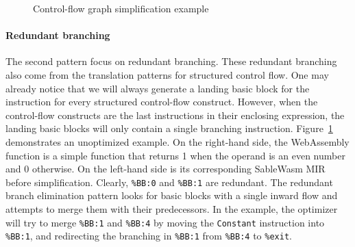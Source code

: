 \begin{figure}
    \begin{minipage}[t]{.49\textwidth}
        
    \end{minipage}\hfill
    \begin{minipage}[t]{.49\textwidth}
        
    \end{minipage}
    \caption{Control-flow graph simplification example}
    \label{fig:simplify-example}
\end{figure}

\paragraph{Redundant branching}
The second pattern focus on redundant branching. These redundant branching also come from the translation patterns for structured control flow. One may already notice that we will always generate a landing basic block for the instruction for every structured control-flow construct. However, when the control-flow constructs are the last instructions in their enclosing expression, the landing basic blocks will only contain a single branching instruction. Figure~\ref{fig:simplify-example} demonstrates an unoptimized example. On the right-hand side, the WebAssembly function is a simple function that returns 1 when the operand is an even number and 0 otherwise. On the left-hand side is its corresponding SableWasm MIR before simplification. Clearly, \texttt{\%BB:0} and \texttt{\%BB:1} are redundant. The redundant branch elimination pattern looks for basic blocks with a single inward flow and attempts to merge them with their predecessors. In the example, the optimizer will try to merge \texttt{\%BB:1} and \texttt{\%BB:4} by moving the \texttt{Constant} instruction into \texttt{\%BB:1}, and redirecting the branching in \texttt{\%BB:1} from \texttt{\%BB:4} to \texttt{\%exit}.

